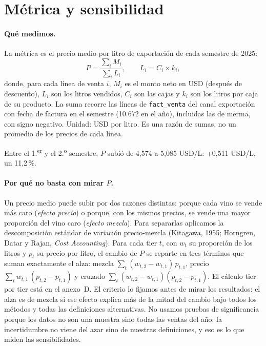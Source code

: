 
\section{Métrica y sensibilidad}

\paragraph{Qué medimos.} La métrica es el precio medio por litro de exportación de cada semestre de 2025:
\[
P = \frac{\sum_i M_i}{\sum_i L_i}, \qquad L_i = C_i \times k_i,
\]
donde, para cada línea de venta $i$, $M_i$ es el monto neto en USD (después de descuento), $L_i$ son los litros vendidos, $C_i$ son las cajas y $k_i$ son los litros por caja de su producto. La suma recorre las líneas de \texttt{fact\_venta} del canal exportación con fecha de factura en el semestre (10.672 en el año), incluidas las de merma, con signo negativo. Unidad: USD por litro. Es una razón de sumas, no un promedio de los precios de cada línea.

Entre el 1.\textsuperscript{er} y el 2.\textsuperscript{o} semestre, $P$ subió de 4,574 a 5,085 USD/L: +0,511 USD/L, un 11,2\,\%.

\paragraph{Por qué no basta con mirar $P$.} Un precio medio puede subir por dos razones distintas: porque cada vino se vende más caro (\emph{efecto precio}) o porque, con los mismos precios, se vende una mayor proporción del vino caro (\emph{efecto mezcla}). Para separarlas aplicamos la descomposición estándar de variación precio-mezcla (Kitagawa, 1955; Horngren, Datar y Rajan, \emph{Cost Accounting}). Para cada tier $t$, con $w_t$ su proporción de los litros y $p_t$ su precio por litro, el cambio de $P$ se reparte en tres términos que suman exactamente el alza: mezcla $\sum_t (w_{t,2}-w_{t,1})\,p_{t,1}$, precio $\sum_t w_{t,1}\,(p_{t,2}-p_{t,1})$ y cruzado $\sum_t (w_{t,2}-w_{t,1})(p_{t,2}-p_{t,1})$. El cálculo tier por tier está en el anexo~D. El criterio lo fijamos antes de mirar los resultados: el alza es de mezcla si ese efecto explica más de la mitad del cambio bajo todos los métodos y todas las definiciones alternativas. No usamos pruebas de significancia porque los datos no son una muestra sino todas las ventas del año: la incertidumbre no viene del azar sino de nuestras definiciones, y eso es lo que miden las sensibilidades.

